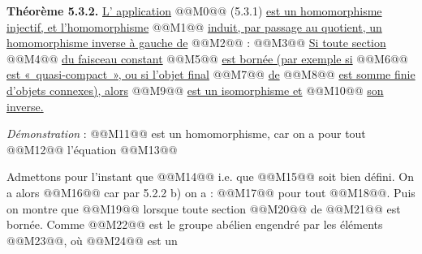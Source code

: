 
\textbf{Théorème 5.3.2.} \uline{L'%
application} @@M0@@ (5.3.1) \uline{est un homomorphisme injectif, et l'homomorphisme}
@@M1@@
\uline{induit, par passage au quotient, un homomorphisme inverse à gauche de} @@M2@@ :
@@M3@@
\uline{Si toute section} @@M4@@ \uline{du faisceau constant} @@M5@@ \uline{est bornée (par exemple si} @@M6@@ \uline{est «~quasi-compact~», ou si l'objet final} @@M7@@ \uline{de} @@M8@@ \uline{est somme finie d'objets connexes), alors} @@M9@@ \uline{est un isomorphisme et} @@M10@@ \uline{son inverse.}

\emph{Démonstration} : @@M11@@ est un homomorphisme, car on a pour tout @@M12@@ l'équation
@@M13@@

Admettons pour l'instant que
@@M14@@
i.e. que @@M15@@ soit bien défini. On a alors
@@M16@@
car par 5.2.2 b) on a :
@@M17@@
pour tout @@M18@@. Puis on montre que
@@M19@@
lorsque toute section @@M20@@ de @@M21@@ est bornée. Comme @@M22@@ est le groupe abélien engendré par les éléments @@M23@@, où @@M24@@ est un
